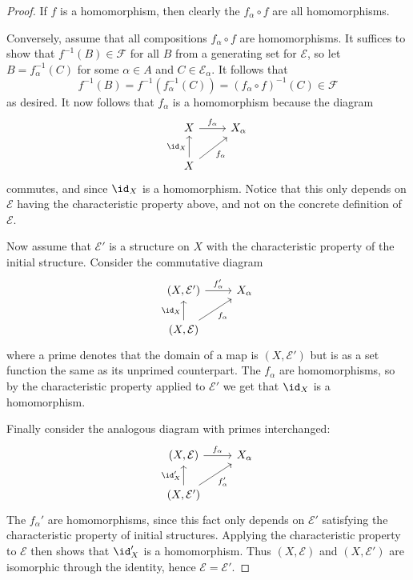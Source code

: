 \documentclass[article, a4paper, 11pt, oneside]{memoir}
\numberwithin{equation}{chapter}
\newcommand{\calE}{\mathcal{E}}
\newcommand{\calF}{\mathcal{F}}
\newcommand{\preim}{^{-1}}
\begin{document}
\begin{proof}
    If $f$ is a homomorphism, then clearly the $f_\alpha \circ f$ are all homomorphisms.

    Conversely, assume that all compositions $f_\alpha \circ f$ are homomorphisms. It suffices to show that $f\preim(B) \in \calF$ for all $B$ from a generating set for $\calE$, so let $B = f_\alpha\preim(C)$ for some $\alpha \in A$ and $C \in \calE_\alpha$. It follows that
    \begin{equation*}
        f\preim(B)
            = f\preim(f_\alpha\preim(C))
            = (f_\alpha \circ f)\preim(C)
            \in \calF
    \end{equation*}
    as desired. It now follows that $f_\alpha$ is a homomorphism because the diagram
    \begin{equation*}
        \begin{tikzcd}
            X
                \ar[r, "f_\alpha"]
            & X_\alpha \\
            X
                \ar[u, "\id_X"]
                \ar[ur, "f_\alpha", swap]
        \end{tikzcd}
    \end{equation*}
    commutes, and since $\id_X$ is a homomorphism. Notice that this only depends on $\calE$ having the characteristic property above, and not on the concrete definition of $\calE$.

    Now assume that $\calE'$ is a structure on $X$ with the characteristic property of the initial structure. Consider the commutative diagram
    \begin{equation*}
        \begin{tikzcd}
            (X,\calE')
                \ar[r, "f_\alpha'"]
            & X_\alpha \\
            (X,\calE)
                \ar[u, "\id_X"]
                \ar[ur, "f_\alpha", swap]
        \end{tikzcd}
    \end{equation*}
    where a prime denotes that the domain of a map is $(X,\calE')$ but is as a set function the same as its unprimed counterpart. The $f_\alpha$ are homomorphisms, so by the characteristic property applied to $\calE'$ we get that $\id_X$ is a homomorphism.

    Finally consider the analogous diagram with primes interchanged:
    \begin{equation*}
        \begin{tikzcd}
            (X,\calE)
                \ar[r, "f_\alpha"]
            & X_\alpha \\
            (X,\calE')
                \ar[u, "\id_X'"]
                \ar[ur, "f_\alpha'", swap]
        \end{tikzcd}
    \end{equation*}
    The $f_\alpha'$ are homomorphisms, since this fact only depends on $\calE'$ satisfying the characteristic property of initial structures. Applying the characteristic property to $\calE$ then shows that $\id_X'$ is a homomorphism. Thus $(X,\calE)$ and $(X,\calE')$ are isomorphic through the identity, hence $\calE = \calE'$.
\end{proof}
\end{document}
